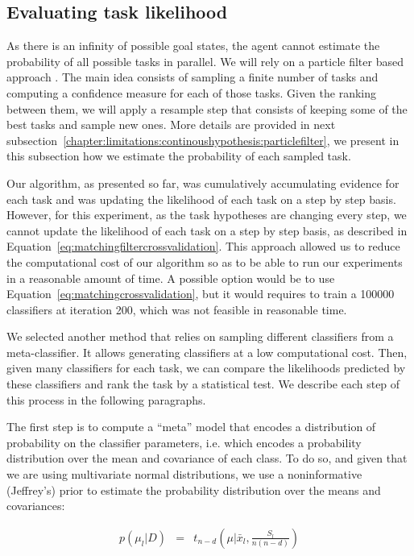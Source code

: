 \subsection{Evaluating task likelihood}

As there is an infinity of possible goal states, the agent cannot estimate the probability of all possible tasks in parallel. We will rely on a particle filter based approach \cite{gordon1993novel,doucet2009tutorial,thrun2002particle}. The main idea consists of sampling a finite number of tasks and computing a confidence measure for each of those tasks. Given the ranking between them, we will apply a resample step that consists of keeping some of the best tasks and sample new ones. More details are provided in next subsection~\ref{chapter:limitations:continoushypothesis:particlefilter}, we present in this subsection how we estimate the probability of each sampled task.

Our algorithm, as presented so far, was cumulatively accumulating evidence for each task and was updating the likelihood of each task on a step by step basis. However, for this experiment, as the task hypotheses are changing every step, we cannot update the likelihood of each task on a step by step basis, as described in Equation~\ref{eq:matchingfiltercrossvalidation}. This approach allowed us to reduce the computational cost of our algorithm so as to be able to run our experiments in a reasonable amount of time. A possible option would be to use Equation~\ref{eq:matchingcrossvalidation}, but it would requires to train a 100000 classifiers at iteration 200, which was not feasible in reasonable time.

We selected another method that relies on sampling different classifiers from a meta-classifier. It allows generating classifiers at a low computational cost. Then, given many classifiers for each task, we can compare the likelihoods predicted by these classifiers and rank the task by a statistical test. We describe each step of this process in the following paragraphs.

The first step is to compute a ``meta'' model that encodes a distribution of probability on the classifier parameters, i.e. which encodes a probability distribution over the mean and covariance of each class. To do so, and given that we are using multivariate normal distributions, we use a noninformative (Jeffrey's) prior \cite{gelman2003bayesian} to estimate the probability distribution over the means and covariances:

\begin{eqnarray}
p(\mu_l|D) & = & t_{n-d}(\mu| \bar{x}_l, \frac{S_l}{n(n-d)})
\label{eq:jeffreysmean}
\end{eqnarray}

